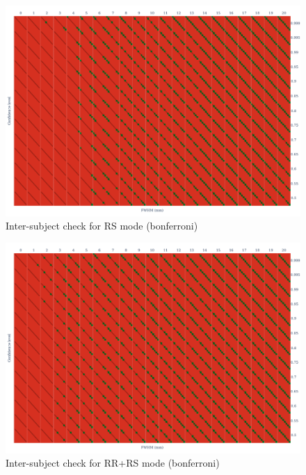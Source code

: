 \documentclass{article}
\begin{document}
\begin{figure}
    \centering
    \includegraphics[width=\linewidth]{figures/inter-subject/one_mct_fwe_bonferroni_RS.pdf}
    \caption{Inter-subject check for RS mode (bonferroni)}
\end{figure}

\begin{figure}
    \centering
    \includegraphics[width=\linewidth]{figures/inter-subject/one_mct_fwe_bonferroni_RR-RS.pdf}
    \caption{Inter-subject check for RR+RS mode (bonferroni)}
\end{figure}
\end{document}
